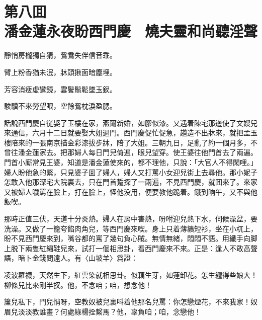
\chapter*{第八囬　\\潘金蓮永夜盼西門慶　燒夫靈和尚聽淫聲}


\begin{myquote}
靜悄房櫳獨自猜，鴛鴦失伴信音乖。

臂上粉香猶未泯，牀頭揪面暗塵埋。

芳容消瘦虚鸞鏡，雲鬢鬅鬆墜玉釵。

駿驥不來勞望眼，空餘鴛枕淚盈腮。
\end{myquote}

話說西門慶自従娶了玉樓在家，燕爾新婚，如膠似漆。又遇着陳宅那邊使了文嫂兒來通信，六月十二日就要娶大姐過門。西門慶促忙促急，趲造不出牀來，就把孟玉樓陪來的一張南京描金彩漆拔步牀，陪了大姐。三朝九日，足亂了約一個月多，不曾往潘金蓮家去。把那婦人每日門兒倚遍，眼兒望穿。使王婆往他門首去了兩遍。門首小廝常見王婆，知道是潘金蓮使來的，都不理他，只說：「大官人不得閑哩。」婦人盼他急的緊，只見婆子囬了婦人，婦人又打罵小女迎兒街上去尋他。那小妮子怎敢入他那深宅大院裏去，只在門首踅探了一兩遍，不見西門慶，就囬來了。來家又被婦人噦罵在臉上，打在臉上，怪他没用，便要教他跪着。餓到晌午，又不與他飯喫。

那時正值三伏，天道十分炎熱。婦人在房中害熱，吩咐迎兒熱下水，伺候澡盆，要洗澡。又做了一籠夸餡肉角兒，等西門慶來喫。身上只着薄纊短衫，坐在小杌上，盼不見西門慶來到，嘴谷都的罵了幾句負心賊。無情無緒，悶悶不語。用纖手向脚上脱下兩隻紅繡鞋兒來，試打一個相思卦，看西門慶來不來。正是：逢人不敢高聲語，暗卜金錢問遠人。有〈山坡羊〉爲證：

\begin{myquote}
凌波羅襪，天然生下，紅雲染就相思卦。似藕生芽，如蓮卸花。怎生纏得些娘大！柳條兒比來剛半扠。他，不念咱；咱，想念他！

簾兒私下，門兒悄呀，空教奴被兒裏呌着他那名兒罵：你怎戀煙花，不來我家！奴眉兒淡淡教誰畫？何處綠楊拴繫馬？他，辜負咱；咱，念戀他！
\end{myquote}

